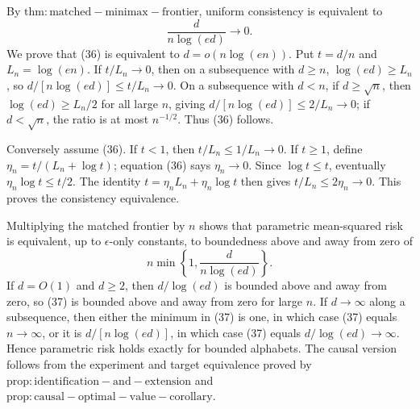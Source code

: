 By \(\mathrm{thm:matched-minimax-frontier}\), uniform consistency is equivalent to
\[
 \frac d{n\log(ed)}\longrightarrow0.                                \tag{36}
\]
We prove that (36) is equivalent to \(d=o(n\log(en))\).  Put \(t=d/n\) and \(L_n=\log(en)\).  If \(t/L_n\to0\), then on a subsequence with \(d\geq n\), \(\log(ed)\geq L_n\), so \(d/[n\log(ed)]\leq t/L_n\to0\).  On a subsequence with \(d<n\), if \(d\geq\sqrt n\), then \(\log(ed)\geq L_n/2\) for all large \(n\), giving \(d/[n\log(ed)]\leq2/L_n\to0\); if \(d<\sqrt n\), the ratio is at most \(n^{-1/2}\).  Thus (36) follows.

Conversely assume (36).  If \(t<1\), then \(t/L_n\leq1/L_n\to0\).  If \(t\geq1\), define \(\eta_n=t/(L_n+\log t)\); equation (36) says \(\eta_n\to0\).  Since \(\log t\leq t\), eventually \(\eta_n\log t\leq t/2\).  The identity \(t=\eta_nL_n+\eta_n\log t\) then gives \(t/L_n\leq2\eta_n\to0\).  This proves the consistency equivalence.

Multiplying the matched frontier by \(n\) shows that parametric mean-squared risk is equivalent, up to \(\epsilon\)-only constants, to boundedness above and away from zero of
\[
 n\min\left\{1,\frac d{n\log(ed)}\right\}.                          \tag{37}
\]
If \(d=O(1)\) and \(d\geq2\), then \(d/\log(ed)\) is bounded above and away from zero, so (37) is bounded above and away from zero for large \(n\).  If \(d\to\infty\) along a subsequence, then either the minimum in (37) is one, in which case (37) equals \(n\to\infty\), or it is \(d/[n\log(ed)]\), in which case (37) equals \(d/\log(ed)\to\infty\).  Hence parametric risk holds exactly for bounded alphabets.  The causal version follows from the experiment and target equivalence proved by \(\mathrm{prop:identification-and-extension}\) and \(\mathrm{prop:causal-optimal-value-corollary}\).